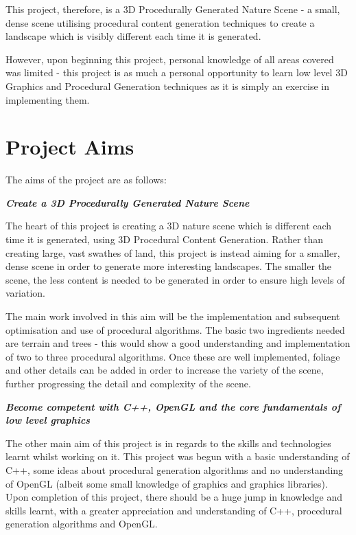 \documentclass[a4paper,10pt]{report}
\begin{document}
This project, therefore, is a 3D Procedurally Generated Nature Scene - a small, dense scene utilising procedural content generation techniques to create a landscape which is visibly different each time it is generated. \medskip

However, upon beginning this project, personal knowledge of all areas covered was limited - this project is as much a personal opportunity to learn low level 3D Graphics and Procedural Generation techniques as it is simply an exercise in implementing them. 

\clearpage
\section{Project Aims}
The aims of the project are as follows:\medskip

\textbf{\textit{Create a 3D Procedurally Generated Nature Scene}} \medskip

The heart of this project is creating a 3D nature scene which is different each time it is generated, using 3D Procedural Content Generation. Rather than creating large, vast swathes of land, this project is instead aiming for a smaller, dense scene in order to generate more interesting landscapes. The smaller the scene, the less content is needed to be generated in order to ensure high levels of variation.\medskip

The main work involved in this aim will be the implementation and subsequent optimisation and use of procedural algorithms. The basic two ingredients needed are terrain and trees - this would show a good understanding and implementation of two to three procedural algorithms. Once these are well implemented, foliage and other details can be added in order to increase the variety of the scene, further progressing the detail and complexity of the scene.  \medskip


\textbf{\textit{Become competent with C++, OpenGL and the core fundamentals of low level graphics}} \medskip

The other main aim of this project is in regards to the skills and technologies learnt whilst working on it. This project was begun with a basic understanding of C++, some ideas about procedural generation algorithms and no understanding of OpenGL (albeit some small knowledge of graphics and graphics libraries). Upon completion of this project, there should be a huge jump in knowledge and skills learnt, with a greater appreciation and understanding of C++, procedural generation algorithms and OpenGL.\medskip
\end{document}
